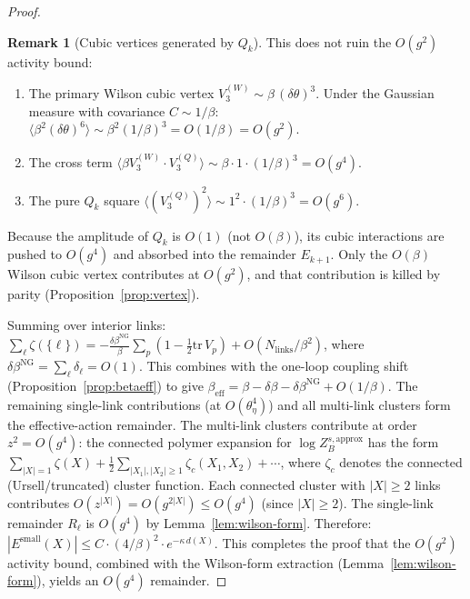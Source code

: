 \documentclass[11pt]{article}
\theoremstyle{definition}
\newtheorem{remark}[theorem]{Remark}
\newcommand{\tr}{\mathrm{tr}}
\begin{document}
\begin{proof}
\begin{remark}[Cubic vertices generated by $Q_k$]
This does not ruin the $O(g^2)$ activity bound:
\begin{enumerate}[nosep,label=(\roman*)]
\item The primary Wilson cubic vertex
$V_3^{(W)}\sim\beta\,(\delta\theta)^3$.
Under the Gaussian measure with covariance $C\sim 1/\beta$:
$\langle\beta^2(\delta\theta)^6\rangle\sim\beta^2(1/\beta)^3
=O(1/\beta)=O(g^2)$.
\item The cross term
$\langle\beta V_3^{(W)}\cdot V_3^{(Q)}\rangle
\sim\beta\cdot 1\cdot(1/\beta)^3=O(g^4)$.
\item The pure $Q_k$ square
$\langle(V_3^{(Q)})^2\rangle
\sim 1^2\cdot(1/\beta)^3=O(g^6)$.
\end{enumerate}
Because the amplitude of $Q_k$ is $O(1)$ (not $O(\beta)$),
its cubic interactions are pushed to $O(g^4)$ and absorbed
into the remainder $E_{k+1}$.  Only the $O(\beta)$ Wilson
cubic vertex contributes at $O(g^2)$, and that contribution
is killed by parity (Proposition~\ref{prop:vertex}).
\end{remark}

Summing over interior links:
$\sum_\ell\zeta(\{\ell\})
=-\frac{\delta\beta^{\mathrm{NG}}}{\beta}\sum_p
(1-\frac{1}{2}\tr\,V_p)+O(N_{\mathrm{links}}/\beta^2)$,
where $\delta\beta^{\mathrm{NG}}=\sum_\ell\delta_\ell=O(1)$.
This combines with the one-loop coupling shift
(Proposition~\ref{prop:betaeff}) to give
$\beta_{\mathrm{eff}}=\beta-\delta\beta-\delta\beta^{\mathrm{NG}}
+O(1/\beta)$.
The remaining single-link contributions (at $O(\theta_\eta^4)$)
and all multi-link clusters form the
effective-action remainder.  The multi-link clusters contribute
at order $z^2=O(g^4)$: the connected polymer expansion for
$\log Z_B^{s,\mathrm{approx}}$ has the form
$\sum_{|X|=1}\zeta(X)+\frac{1}{2}\sum_{|X_1|,|X_2|\ge 1}
\zeta_c(X_1,X_2)+\cdots$, where $\zeta_c$ denotes the
connected (Ursell/truncated) cluster function.  Each connected
cluster with $|X|\ge 2$ links contributes $O(z^{|X|})
=O(g^{2|X|})\le O(g^4)$ (since $|X|\ge 2$).  The single-link
remainder $R_\ell$ is $O(g^4)$ by Lemma~\ref{lem:wilson-form}.
Therefore:
$|E^{\mathrm{small}}(X)|\le C\cdot(4/\beta)^2
\cdot e^{-\kappa\,d(X)}$.
This completes the proof that the $O(g^2)$ activity bound,
combined with the Wilson-form extraction
(Lemma~\ref{lem:wilson-form}), yields an $O(g^4)$ remainder.
\end{proof}
\end{document}
